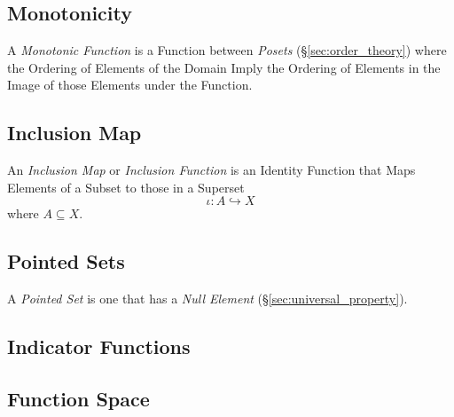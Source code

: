 \subsection{Monotonicity}\label{sec:monotonicity}

A \emph{Monotonic Function} is a Function between \emph{Posets}
(\S\ref{sec:order_theory}) where the Ordering of Elements of the
Domain Imply the Ordering of Elements in the Image of those Elements
under the Function.



\subsection{Inclusion Map}\label{sec:inclusion_map}

An \emph{Inclusion Map} or \emph{Inclusion Function} is an Identity
Function that Maps Elements of a Subset to those in a Superset
\[
    \iota : A \hookrightarrow X
\]
where $A \subseteq X$.



\subsection{Pointed Sets}

A \emph{Pointed Set} is one that has a \emph{Null Element}
(\S\ref{sec:universal_property}).



\subsection{Indicator Functions}\label{sec:indicator_function}

\subsection{Function Space}\label{sec:function_space}

